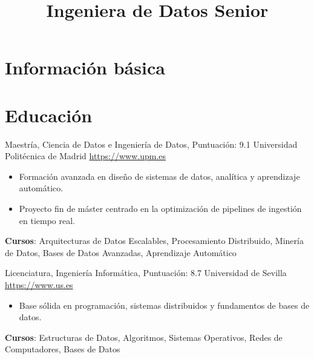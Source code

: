 \documentclass[a4paper, serif, 10pt]{moderncv}
\title{Ingeniera de Datos Senior}
\begin{document}
\maketitle

\section{Información básica}

\section{Educación}

        {Maestría, Ciencia de Datos e Ingeniería de Datos, Puntuación: 9.1}
        {Universidad Politécnica de Madrid}
        {\url{https://www.upm.es}}
        {}
        {\begin{itemize}
\item Formación avanzada en diseño de sistemas de datos, analítica y aprendizaje automático.
\item Proyecto fin de máster centrado en la optimización de pipelines de ingestión en tiempo real.
\end{itemize}
\textbf{Cursos}: Arquitecturas de Datos Escalables, Procesamiento Distribuido, Minería de Datos, Bases de Datos Avanzadas, Aprendizaje Automático}

        {Licenciatura, Ingeniería Informática, Puntuación: 8.7}
        {Universidad de Sevilla}
        {\url{https://www.us.es}}
        {}
        {\begin{itemize}
\item Base sólida en programación, sistemas distribuidos y fundamentos de bases de datos.
\end{itemize}
\textbf{Cursos}: Estructuras de Datos, Algoritmos, Sistemas Operativos, Redes de Computadores, Bases de Datos}
\end{document}
